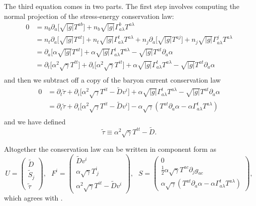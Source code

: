 \documentclass[12pt]{article}
\numberwithin{equation}{section}
\begin{document}
The third equation comes in two parts.
The first step involves computing the normal projection of the stress-energy conservation law:
\begin{equation}
\begin{aligned}
0 &= n_b \partial_a \big[ \sqrt{|g|} T^{ab} \big] + n_b \sqrt{|g|} \Gamma^{b}_{a \lambda} T^{a \lambda} \\
&= n_t \partial_a \big[ \sqrt{|g|} T^{at} \big] + n_t \sqrt{|g|} \Gamma^{t}_{a \lambda} T^{a \lambda} + n_j \partial_a \big[ \sqrt{|g|} T^{aj} \big] + n_j \sqrt{|g|} \Gamma^{j}_{a \lambda} T^{a \lambda} \\
&= \partial_a \big[ \alpha \sqrt{|g|} T^{at} \big] + \alpha \sqrt{|g|} \Gamma^{t}_{a \lambda} T^{a \lambda} - \sqrt{|g|} T^{at} \partial_a \alpha \\
&= \partial_t \big[ \alpha^2 \sqrt{\gamma} T^{tt} \big] + \partial_i \big[ \alpha^2 \sqrt{\gamma} T^{it} \big] + \alpha \sqrt{|g|} \Gamma^{t}_{a \lambda} T^{a \lambda} - \sqrt{|g|} T^{at} \partial_a \alpha \\
\end{aligned}
\end{equation}
and then we subtract off a copy of the baryon current conservation law
\begin{equation}
\begin{aligned}
0 &= \partial_t \tilde{\tau} + \partial_i \big[ \alpha^2 \sqrt{\gamma} T^{it} - \tilde{D} v^i \big] + \alpha \sqrt{|g|} \Gamma^{t}_{a \lambda} T^{a \lambda} - \sqrt{|g|} T^{at} \partial_a \alpha \\
&= \partial_t \tilde{\tau} + \partial_i \big[ \alpha^2 \sqrt{\gamma} T^{it} - \tilde{D} v^i \big] - \alpha \sqrt{\gamma} (T^{at} \partial_a \alpha - \alpha \Gamma^{t}_{a \lambda} T^{a \lambda}) \\
\end{aligned}
\end{equation}
and we have defined
\begin{equation}
\tilde{\tau} \equiv \alpha^2 \sqrt{\gamma} T^{tt} - \tilde{D}.
\end{equation}

Altogether the conservation law can be written in component form as
\begin{equation} \label{eq:Baumgarte_cons_comps}
U =
\begin{pmatrix}
\tilde{D} \\
\tilde{S}_j \\
\tilde{\tau}
\end{pmatrix},~~~
F^{i} =
\begin{pmatrix}
\tilde{D} v^i \\
\alpha \sqrt{\gamma} T^{i}_{~j} \\
\alpha^2 \sqrt{\gamma} T^{it} - \tilde{D} v^i
\end{pmatrix},~~~
S =
\begin{pmatrix}
0 \\
\frac{1}{2} \alpha \sqrt{\gamma} T^{ac} \partial_{j} g_{ac} \\
\alpha \sqrt{\gamma} (T^{at} \partial_a \alpha - \alpha \Gamma^{t}_{a \lambda} T^{a \lambda})
\end{pmatrix},
\end{equation}
which agrees with \cite{BaumgarteShapiro}.
\end{document}
